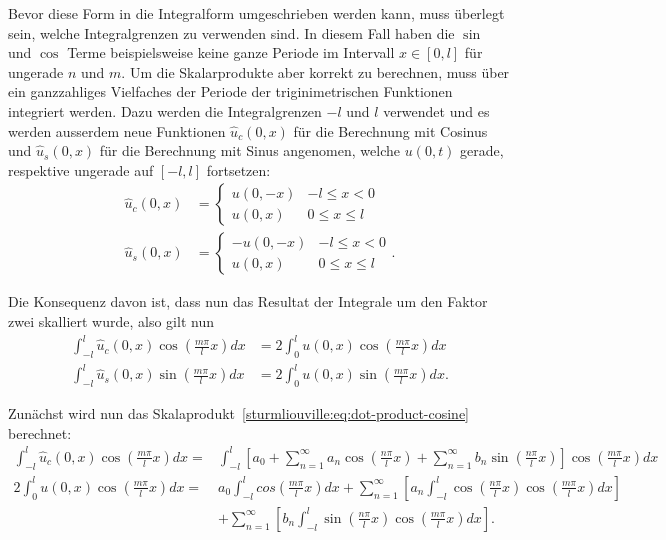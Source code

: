 Bevor diese Form in die Integralform umgeschrieben werden kann, muss überlegt
sein, welche Integralgrenzen zu verwenden sind.
In diesem Fall haben die $\sin$ und $\cos$ Terme beispielsweise keine ganze
Periode im Intervall $x \in [0, l]$ für ungerade $n$ und $m$.
Um die Skalarprodukte aber korrekt zu berechnen, muss über ein ganzzahliges
Vielfaches der Periode der triginimetrischen Funktionen integriert werden.
Dazu werden die Integralgrenzen $-l$ und $l$ verwendet und es werden ausserdem
neue Funktionen $\hat{u}_c(0, x)$ für die Berechnung mit Cosinus und
$\hat{u}_s(0, x)$ für die Berechnung mit Sinus angenomen, welche $u(0, t)$
gerade, respektive ungerade auf $[-l, l]$ fortsetzen:
\[
\begin{aligned}
    \hat{u}_c(0, x)
    &=
    \begin{cases}
        u(0, -x) & -l \leq x < 0
        \\
        u(0, x) & 0 \leq x \leq l
    \end{cases}
    \\
    \hat{u}_s(0, x)
    &=
    \begin{cases}
        -u(0, -x) & -l \leq x < 0
        \\
        u(0, x) & 0 \leq x \leq l
    \end{cases}.
\end{aligned}
\]

Die Konsequenz davon ist, dass nun das Resultat der Integrale um den Faktor zwei
skalliert wurde, also gilt nun
\[
\begin{aligned}
    \int_{-l}^{l}\hat{u}_c(0, x)\cos\left(\frac{m \pi}{l}x\right)dx
    &=
    2\int_{0}^{l}u(0, x)\cos\left(\frac{m \pi}{l}x\right)dx
    \\
    \int_{-l}^{l}\hat{u}_s(0, x)\sin\left(\frac{m \pi}{l}x\right)dx
    &=
    2\int_{0}^{l}u(0, x)\sin\left(\frac{m \pi}{l}x\right)dx.
\end{aligned}
\]

Zunächst wird nun das Skalaprodukt~\eqref{sturmliouville:eq:dot-product-cosine}
berechnet:
\[
\begin{aligned}
    \int_{-l}^{l}\hat{u}_c(0, x)\cos\left(\frac{m \pi}{l}x\right)dx
    =&
    \int_{-l}^{l} \left[a_0
    +
    \sum_{n = 1}^{\infty} a_n\cos\left(\frac{n\pi}{l}x\right)
    +
    \sum_{n = 1}^{\infty} b_n\sin\left(\frac{n\pi}{l}x\right)\right]
    \cos\left(\frac{m \pi}{l}x\right) dx
    \\
    2\int_{0}^{l}u(0, x)\cos\left(\frac{m \pi}{l}x\right)dx
    =&
    a_0 \int_{-l}^{l}cos\left(\frac{m \pi}{l}x\right) dx
    +
    \sum_{n = 1}^{\infty}\left[a_n\int_{-l}^{l}\cos\left(\frac{n\pi}{l}x\right)
        \cos\left(\frac{m \pi}{l}x\right)dx\right]
    \\
    &+
    \sum_{n = 1}^{\infty}\left[b_n\int_{-l}^{l}\sin\left(\frac{n\pi}{l}x\right)
        \cos\left(\frac{m \pi}{l}x\right)dx\right].
\end{aligned}
\]

